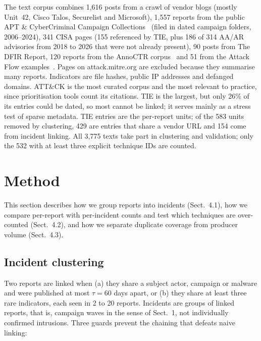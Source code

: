 \documentclass[runningheads]{llncs}
\newcommand{\attack}{ATT\&CK}
\begin{document}
The text corpus combines 1,616 posts from a crawl of vendor blogs (mostly Unit~42, Cisco Talos, Securelist and Microsoft), 1,557 reports from the public APT \& CyberCriminal Campaign Collections~\cite{cybermonitor2024apt} (filed in dated campaign folders, 2006--2024), 341 CISA pages (155 referenced by TIE, plus 186 of 314 AA/AR advisories from 2018 to 2026 that were not already present), 90 posts from The DFIR Report, 120 reports from the AnnoCTR corpus~\cite{lange2024annoctr} and 51 from the Attack Flow examples~\cite{ctid2022attackflow}. Pages on attack.mitre.org are excluded because they summarise many reports. Indicators are file hashes, public IP addresses and defanged domains. \attack{} is the most curated corpus and the most relevant to practice, since prioritisation tools count its citations. TIE is the largest, but only 26\% of its entries could be dated, so most cannot be linked; it serves mainly as a stress test of sparse metadata. TIE entries are the per-report units; of the 583 units removed by clustering, 429 are entries that share a vendor URL and 154 come from incident linking. All 3,775 texts take part in clustering and validation; only the 532 with at least three explicit technique IDs are counted.

\section{Method}

This section describes how we group reports into incidents (Sect.~4.1), how we compare per-report with per-incident counts and test which techniques are over-counted (Sect.~4.2), and how we separate duplicate coverage from producer volume (Sect.~4.3).

\subsection{Incident clustering}

Two reports are linked when (a) they share a subject actor, campaign or malware and were published at most $\tau = 60$ days apart, or (b) they share at least three rare indicators, each seen in 2 to 20 reports. Incidents are groups of linked reports, that is, campaign waves in the sense of Sect.~1, not individually confirmed intrusions. Three guards prevent the chaining that defeats naive linking:
\end{document}
